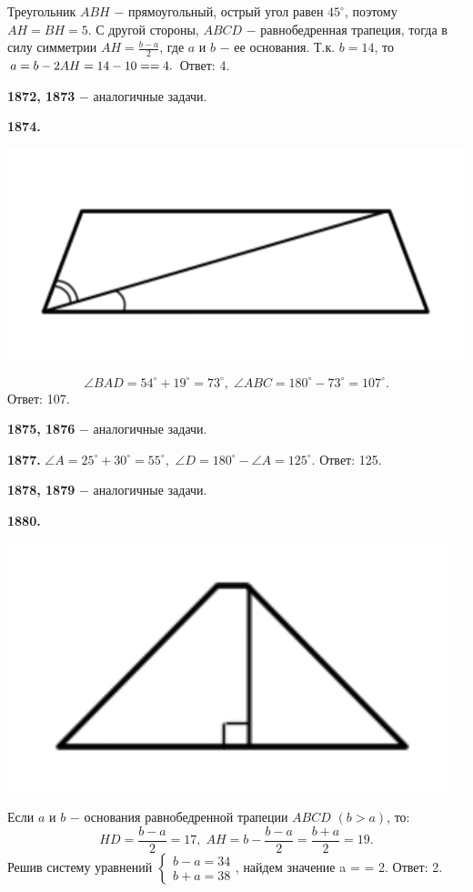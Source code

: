Треугольник $ABH$ $-$ прямоугольный, острый угол равен $45^\circ$, поэтому $AH = BH = 5$. С другой стороны, $ABCD$ $-$ равнобедренная трапеция, тогда в силу симметрии $AH = \frac{b - a}{2}$, где $a$ и $b$ $-$ ее основания. Т.к. $b = 14$, то $a = b - 2AH = 14 - 10 = \linebreak = 4.$ \newline \null \hspace*{\fill} Ответ: 4.

\textbf{1872, 1873} $-$ аналогичные задачи.

\textbf{1874.}

{\centering \includegraphics[width=0.5\linewidth]{Geometry/Content/21.png}
	
}
\[
\angle BAD = 54^\circ + 19^\circ = 73^\circ, \;\angle ABC = 180^\circ - 73^\circ = 107^\circ.
\]\null \hspace*{\fill} Ответ: 107.

\textbf{1875, 1876} $-$ аналогичные задачи.

\textbf{1877.} $\angle A = 25^\circ + 30^\circ = 55^\circ,$ $\angle D = 180^\circ - \angle A = 125^\circ.$ \newline \null \hspace*{\fill} Ответ: 125.

\textbf{1878, 1879} $-$ аналогичные задачи.

\textbf{1880.}

{\centering \includegraphics[width=0.4\linewidth]{Geometry/Content/22.png}
	
}

Если $a$ и $b$ $-$ основания равнобедренной трапеции $ABCD$ $(b > a)$, то:
\[
HD = \frac{b - a}{2} = 17,\; AH = b - \frac{b - a}{2} = \frac{b + a}{2} = 19.
\]
Решив систему уравнений  $\begin{cases} b - a =34 \\ b + a = 38 \end{cases}$, найдем значение a = \linebreak = 2. \newline \null \hspace*{\fill} Ответ: 2.

